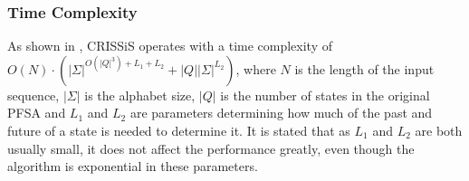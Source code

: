 {\subsubsection{Time Complexity}

As shown in \citep{asok.11}, CRISSiS operates with a time complexity of $O(N)\cdot(|\Sigma|^{O(|Q|^3)+L_1+L_2}+|Q||\Sigma|^{L_2})$, where $N$ is the length of the input sequence, $|\Sigma|$ is the alphabet size, $|Q|$ is the number of states in the original PFSA and $L_1$ and $L_2$ are parameters determining how much of the past and future of a state is needed to determine it. It is stated that as $L_1$ and $L_2$ are both usually small, it does not affect the performance greatly, even though the algorithm is exponential in these parameters.																					

%
%
%
}
